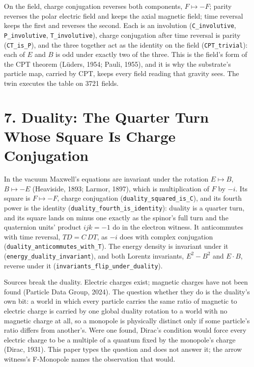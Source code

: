 \documentclass[10pt]{article}
\begin{document}
On the field, charge conjugation reverses both components,
\(F\mapsto-F\); parity reverses the polar electric field and keeps the
axial magnetic field; time reversal keeps the first and reverses the
second. Each is an involution (\texttt{C\_involutive},
\texttt{P\_involutive}, \texttt{T\_involutive}), charge conjugation
after time reversal is parity (\texttt{CT\_is\_P}), and the three
together act as the identity on the field (\texttt{CPT\_trivial}): each
of \(E\) and \(B\) is odd under exactly two of the three. This is the
field's form of the CPT theorem (Lüders, 1954; Pauli, 1955), and it is
why the substrate's particle map, carried by CPT, keeps every field
reading that gravity sees. The twin executes the table on 3721 fields.

\hypertarget{duality-the-quarter-turn-whose-square-is-charge-conjugation}{%
\section{7. Duality: The Quarter Turn Whose Square Is Charge
Conjugation}\label{duality-the-quarter-turn-whose-square-is-charge-conjugation}}

In the vacuum Maxwell's equations are invariant under the rotation
\(E\mapsto B\), \(B\mapsto -E\) (Heaviside, 1893; Larmor, 1897), which
is multiplication of \(F\) by \(-i\). Its square is \(F\mapsto-F\),
charge conjugation (\texttt{duality\_squared\_is\_C}), and its fourth
power is the identity (\texttt{duality\_fourth\_is\_identity}): duality
is a quarter turn, and its square lands on minus one exactly as the
spinor's full turn and the quaternion units' product \(ijk=-1\) do in
the electron witness. It anticommutes with time reversal, \(TD=C\,DT\),
as \(-i\) does with complex conjugation
(\texttt{duality\_anticommutes\_with\_T}). The energy density is
invariant under it (\texttt{energy\_duality\_invariant}), and both
Lorentz invariants, \(E^2-B^2\) and \(E\cdot B\), reverse under it
(\texttt{invariants\_flip\_under\_duality}).

Sources break the duality. Electric charges exist; magnetic charges have
not been found (Particle Data Group, 2024). The question whether they do
is the duality's own bit: a world in which every particle carries the
same ratio of magnetic to electric charge is carried by one global
duality rotation to a world with no magnetic charge at all, so a
monopole is physically distinct only if some particle's ratio differs
from another's. Were one found, Dirac's condition would force every
electric charge to be a multiple of a quantum fixed by the monopole's
charge (Dirac, 1931). This paper types the question and does not answer
it; the arrow witness's F-Monopole names the observation that would.
\end{document}
